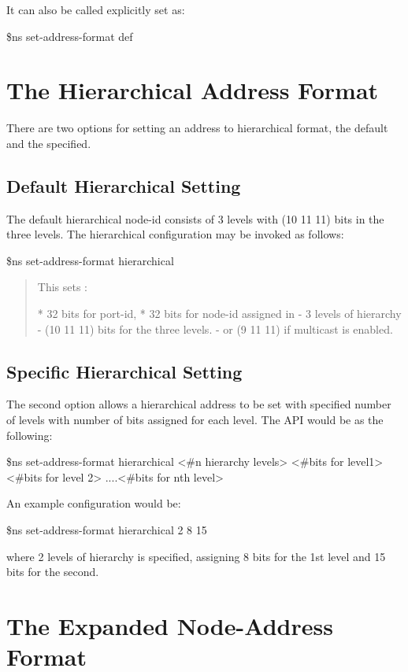 It can also be called explicitly set as:
\begin{program}
\$ns set-address-format def
\end{program}


\section{The Hierarchical Address Format}
\label{sec:hierFormat}

There are two options for setting an address to hierarchical format, the
default and the specified.

\subsection{Default Hierarchical Setting}
\label{sec:def-hier}
The default hierarchical node-id consists of 3 levels with (10 11 11) bits
in the three levels. The hierarchical configuration may be invoked as
follows: 

\$ns set-address-format hierarchical

\begin{quote}
This sets :

* 32 bits for port-id, 
* 32 bits for node-id assigned in 
  - 3 levels of hierarchy 
  - (10 11 11) bits for the three levels. 
  - or (9 11 11) if multicast is enabled. 
\end{quote}

\subsection{Specific Hierarchical Setting}
\label{sec:sp-hier}
The second option allows a hierarchical address to be set with specified
number of levels with number of bits assigned for each level. The API
would be as the following:

\$ns set-address-format hierarchical <\#n hierarchy levels> <\#bits for
level1> <\#bits for level 2> ....<\#bits for nth level> 


An example configuration would be:

\$ns set-address-format hierarchical 2 8 15 

where 2 levels of hierarchy is specified, assigning 8 bits for the 1st
level and 15 bits for the second.


\section{The Expanded Node-Address Format}
\label{sec:expandFormat}


